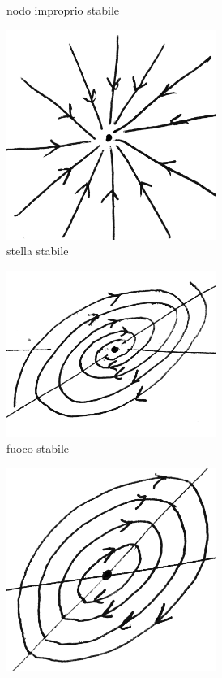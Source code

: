 \begin{figure}
\begin{subfigure}{5cm}
  \caption{nodo improprio stabile}
 \end{subfigure}
 \begin{subfigure}{5cm}
  \includegraphics[width=0.75\textwidth]{sistemi_stella.png}
  \caption{stella stabile}
 \end{subfigure}
 \begin{subfigure}{5cm}
  \includegraphics[width=0.75\textwidth]{sistemi_fuoco.png}
  \caption{fuoco stabile}
 \end{subfigure}
 \begin{subfigure}{5cm}
  \includegraphics[width=0.75\textwidth]{sistemi_centro.png}

\end{subfigure}
\end{figure}
